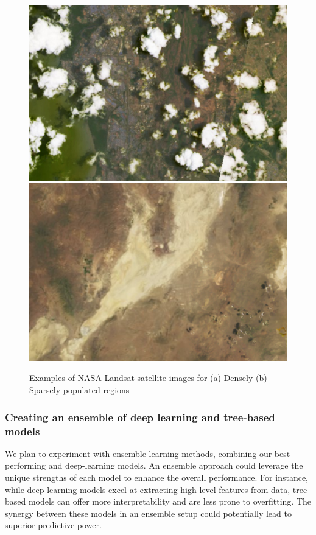\documentclass{article}
\begin{document}
\begin{figure}[htp]
    \centering
    \includegraphics[width=.4\linewidth]{./images/dense.jpeg}
    \hfil
    \includegraphics[width=.4\linewidth]{./images/sparse.png}
    \caption{Examples of NASA Landsat satellite images for (a) Densely (b) Sparsely populated regions}
    \label{fig:nasa_images}
\end{figure}

\subsubsection{Creating an ensemble of deep learning and tree-based models} 

We plan to experiment with ensemble learning methods, combining our best-performing and deep-learning models. An ensemble approach could leverage the unique strengths of each model to enhance the overall performance. For instance, while deep learning models excel at extracting high-level features from data, tree-based models can offer more interpretability and are less prone to overfitting. The synergy between these models in an ensemble setup could potentially lead to superior predictive power.




\end{document}
